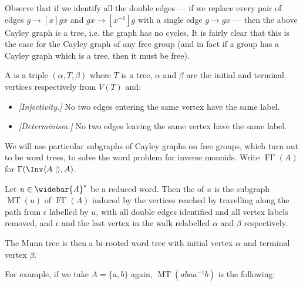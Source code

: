 \documentclass[noindex,noinsetproof,12pt]{lmaths}
\newcommand{\Abar}{\widebar{A}}
\DeclareMathOperator{\FGamma}{F\Gamma}
\DeclareMathOperator{\MT}{MT}
\begin{document}
\begin{center}
	\end{center}

Observe that if we identify all the double edges --- if we replace every pair of edges $g \to[x] gx$ and $gx \to[x^{-1}] g$ with a single edge $g \to gx$ --- then the above Cayley graph is a tree, i.e. the graph has no cycles. It is fairly clear that this is the case for the Cayley graph of any free group (and in fact if a group has a Cayley graph which is a tree, then it must be free).


\begin{defn}
	A  is a triple $(\alpha, T, \beta)$ where $T$ is a tree, $\alpha$ and $\beta$ are the initial and terminal vertices respectively from $V(T)$ and:
	\begin{itemize}[(i)]
		\item \emph{[Injectivity.]} No two edges entering the same vertex have the same label.
		\item \emph{[Determinism.]} No two edges leaving the same vertex have the same label.
	\end{itemize}
\end{defn}

We will use particular subgraphs of Cayley graphs on free groups, which turn out to be word trees, to solve the word problem for inverse monoids. Write $\FGamma(A)$ for $\Gamma(\Inv \langle A \mid\rangle, A)$.

\begin{defn}
	Let $u \in \Abar^*$ be a reduced word. Then the  of $u$ is the subgraph $\MT(u)$ of $\FGamma(A)$ induced by the vertices reached by travelling along the path from $\epsilon$ labelled by $u$, with all double edges identified and all vertex labels removed, and $\epsilon$ and the last vertex in the walk relabelled $\alpha$ and $\beta$ respectively. 
\end{defn}

The Munn tree is then a bi-rooted word tree with initial vertex $\alpha$ and terminal vertex $\beta$.

For example, if we take $A = \{a, b\}$ again, $\MT(abaa^{-1}b)$ is the following:
\end{document}
